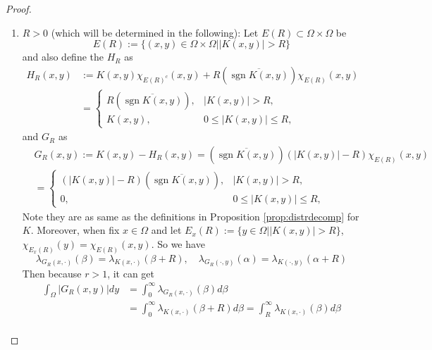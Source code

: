 \begin{proof}
	\begin{enumerate}[label=(\Roman*)]
		\item $R > 0$ (which will be determined in the following): Let $E(R) \subset \Omega \times \Omega$ be
		\begin{equation*}
			E(R):=\{(x, y) \in \Omega \times \Omega| | K(x, y) \mid>R\}
		\end{equation*}
		and also define the $H_R$ as
		\begin{equation*}
			\begin{aligned}
				H_R(x, y) & :=K(x, y) \chi_{E(R)^c}(x, y)+R(\overline{\operatorname{sgn} K(x, y)}) \chi_{E(R)}(x, y) \\
				& = \begin{cases}R(\overline{\operatorname{sgn} K(x, y)}), & |K(x, y)|>R, \\
				K(x, y), & 0 \leq|K(x, y)| \leq R,\end{cases}
			\end{aligned}
		\end{equation*}
		and $G_R$ as
		\begin{equation*}
			\begin{aligned}
				& G_R(x, y):=K(x, y)-H_R(x, y)=(\overline{\operatorname{sgn} K(x, y)})(|K(x, y)|-R) \chi_{E(R)}(x, y) \\
				& =\left\{\begin{array}{ll}
				(|K(x, y)|-R)(\overline{\operatorname{sgn} K(x, y)}), & |K(x, y)|>R, \\
				0, & 0 \leq|K(x, y)| \leq R,
				\end{array}\right.
			\end{aligned}
		\end{equation*}
		Note they are as same as the definitions in Proposition \ref{prop:distrdecomp} for $K$. Moreover, when fix $x \in \Omega$ and let $E_x(R):=\{y \in \Omega| | K(x, y) \mid>R\}$, $\chi_{E_x(R)}(y)=\chi_{E(R)}(x, y)$. So we have
		\begin{equation*}
			\lambda_{G_R(x, \cdot)}(\beta)=\lambda_{K(x, \cdot)}(\beta+R),\quad \lambda_{G_R(\cdot, y)}(\alpha)=\lambda_{K(\cdot, y)}(\alpha+R)
		\end{equation*}
		Then because $r > 1$, it can get
		\begin{equation*}
			\begin{aligned}
				\int_{\Omega}\left|G_R(x, y)\right| d y & =\int_0^{\infty} \lambda_{G_R(x, \cdot)}(\beta) d \beta \\
				& =\int_0^{\infty} \lambda_{K(x, \cdot)}(\beta+R) d \beta=\int_R^{\infty} \lambda_{K(x, \cdot)}(\beta) d \beta \\

\end{aligned}
\end{equation*}
\end{enumerate}
\end{proof}
